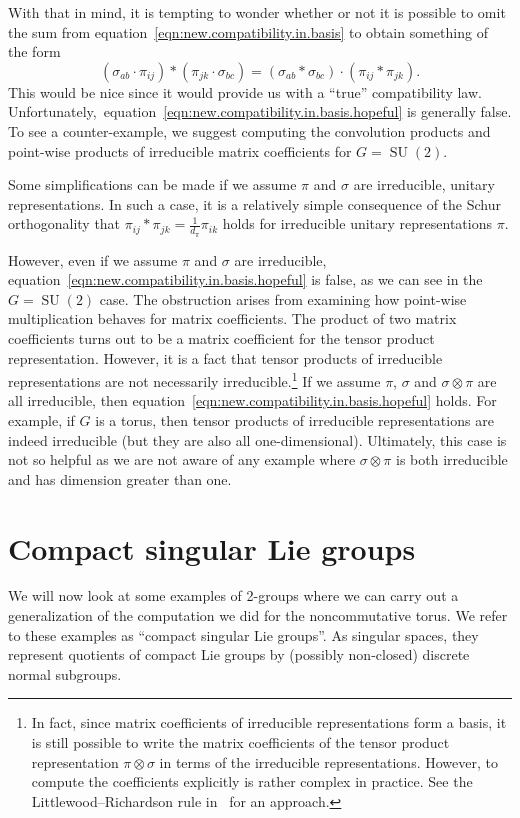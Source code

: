 \documentclass[10pt,a4paper]{amsart}
\numberwithin{equation}{section}
\theoremstyle{definition}
\DeclareMathOperator{\SU}{SU}
\begin{document}
With that in mind, it is tempting to wonder whether or not it is possible to omit the sum from equation~\eqref{eqn:new.compatibility.in.basis} to obtain something of the form
\begin{equation}\label{eqn:new.compatibility.in.basis.hopeful}
  (\sigma_{ab} \cdot \pi_{ij} ) * (\pi_{jk} \cdot \sigma_{bc}) = (\sigma_{ab} * \sigma_{bc} ) \cdot (\pi_{ij} * \pi_{jk}).
\end{equation}
This would be nice since it would provide us with a ``true'' compatibility law. Unfortunately,\ equation~\eqref{eqn:new.compatibility.in.basis.hopeful} is generally false. To see a counter-example, we suggest computing the convolution products and point-wise products of irreducible matrix coefficients for $ G = \SU(2) $.

Some simplifications can be made if we assume $ \pi $ and $ \sigma $ are irreducible, unitary representations. In such a case, it is a relatively simple consequence of the Schur orthogonality that
$ \pi_{ij} * \pi_{jk} = \frac{1}{d_\pi} \pi_{ik}$
holds for irreducible unitary representations $ \pi $.

However, even if we assume $ \pi $ and $ \sigma $ are irreducible, equation~\eqref{eqn:new.compatibility.in.basis.hopeful} is false, as we can see in the $ G= \SU(2)$ case. The obstruction arises from examining how point-wise multiplication behaves for matrix coefficients. The product of two matrix coefficients turns out to be a matrix coefficient for the tensor product representation. However, it is a fact that tensor products of irreducible representations are not necessarily irreducible.\footnote{In fact, since matrix coefficients of irreducible representations form a basis, it is still possible to write the matrix coefficients of the tensor product representation $\pi\otimes\sigma$ in terms of the irreducible representations. However, to compute the coefficients explicitly is rather complex in practice. See the Littlewood--Richardson rule in~\cite{KnappBeyond} for an approach.} If we assume $ \pi$, $\sigma $ and $ \sigma \otimes \pi$ are all irreducible, then equation~\eqref{eqn:new.compatibility.in.basis.hopeful} holds. For example, if $ G $ is a torus, then tensor products of irreducible representations are indeed irreducible (but they are also all one-dimensional). Ultimately, this case is not so helpful as we are not aware of any example where $ \sigma \otimes \pi $ is both irreducible and has dimension greater than one.

\section{Compact singular Lie groups}\label{Section:compact.singular.Lie.groups}
We will now look at some examples of 2-groups where we can carry out a generalization of the computation we did for the noncommutative torus. We refer to these examples as ``compact singular Lie groups''. As singular spaces, they represent quotients of compact Lie groups by (possibly non-closed) discrete normal subgroups.
\end{document}
